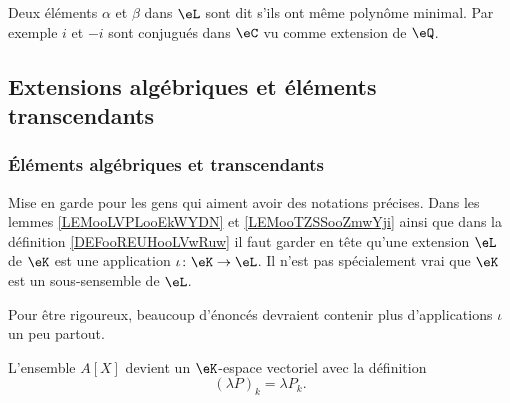 \begin{definition}		\label{DEFooJQQYooMKqWov}
	Deux éléments \( \alpha\) et \( \beta\) dans \( \eL\) sont dit  s'ils ont même polynôme minimal. Par exemple \( i\) et \( -i\) sont conjugués dans \( \eC\) vu comme extension de \( \eQ\).
\end{definition}

\subsection{Extensions algébriques et éléments transcendants}

\subsubsection{Éléments algébriques et transcendants}

\begin{normaltext}
	Mise en garde pour les gens qui aiment avoir des notations précises. Dans les lemmes \ref{LEMooLVPLooEkWYDN} et \ref{LEMooTZSSooZmwYji} ainsi que dans la définition \ref{DEFooREUHooLVwRuw} il faut garder en tête qu'une extension \( \eL\) de \(\eK\) est une application \(\iota \colon \eK\to \eL  \). Il n'est pas spécialement vrai que \( \eK\) est un sous-sensemble de \( \eL\).

	Pour être rigoureux, beaucoup d'énoncés devraient contenir plus d'applications \( \iota\) un peu partout.
\end{normaltext}


\begin{definition}      \label{DEFooBBYGooWoOloR}
	L'ensemble \( A[X]\) devient un \( \eK\)-espace vectoriel avec la définition
	\begin{equation}
		(\lambda P)_k=\lambda P_k.
	\end{equation}
\end{definition}

